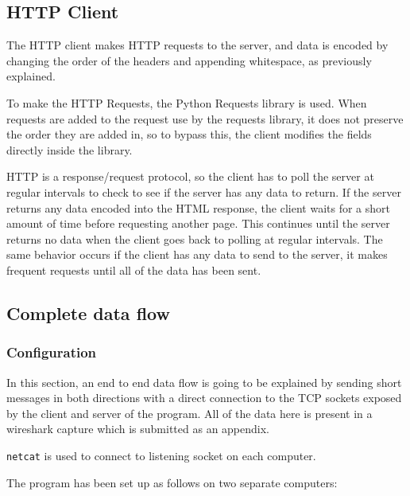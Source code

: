 \subsection{HTTP Client}
The HTTP client makes HTTP requests to the server, and data is encoded by changing the order of the headers and appending whitespace, as previously explained.\par
To make the HTTP Requests, the Python Requests library is used. When requests are added to the request use by the requests library, it does not preserve the order they are added in, so to bypass this, the client modifies the fields directly inside the library.\par
HTTP is a response/request protocol, so the client has to poll the server at regular intervals to check to see if the server has any data to return. If the server returns any data encoded into the HTML response, the client waits for a short amount of time before requesting another page. This continues until the server returns no data when the client goes back to polling at regular intervals. The same behavior occurs if the client has any data to send to the server, it makes frequent requests until all of the data has been sent.

\subsection{Complete data flow}
\subsubsection{Configuration}
In this section, an end to end data flow is going to be explained by sending short messages in both directions with a direct connection to the TCP sockets exposed by the client and server of the program. All of the data here is present in a wireshark capture which is submitted as an appendix.\par
\vspace{0.2cm}

\texttt{netcat} is used to connect to listening socket on each computer.\par
\vspace{0.2cm}

The program has been set up as follows on two separate computers:

